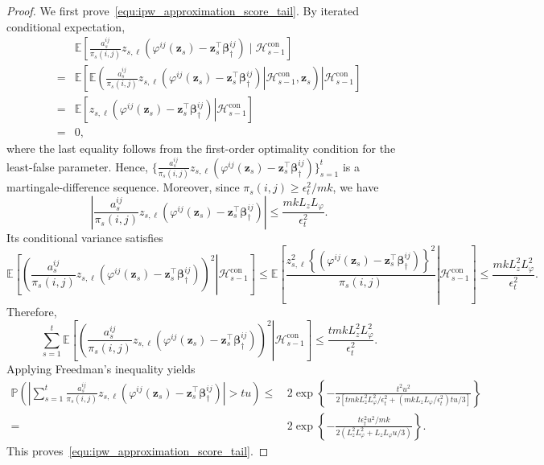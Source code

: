 \documentclass[12pt]{article}
\begin{document}
\begin{proof}
We first prove~\eqref{equ:ipw_approximation_score_tail}. 
By iterated conditional expectation,
\begin{align*}
& \mathbb E
\left[
\frac{ a_s^{ij} }{ \pi_s(i,j) } z_{s,\ell} \left(\varphi^{ij}(\bm z_s) - \bm z_s^\top\bm\beta_\dagger^{ij} \right)
\mid
\mathcal H_{s-1}^{\mathrm{con}}
\right] \\
=&
\mathbb E
\left[\left.
\mathbb E\left(
\left.\frac{a_s^{ij}}{\pi_s(i,j)}z_{s,\ell}
\left(\varphi^{ij}(\bm z_s) - \bm z_s^\top\bm\beta_\dagger^{ij} \right)
\right|
\mathcal H_{s-1}^{\mathrm{con}},\bm z_s
\right)\right|\mathcal H_{s-1}^{\mathrm{con}}\right] \\
=&
\mathbb E
\left[
z_{s,\ell} \left.
\left(\varphi^{ij}(\bm z_s) - \bm z_s^\top\bm\beta_\dagger^{ij} \right) \right|\mathcal H_{s-1}^{\mathrm{con}} 
\right] \\
=& 0,
\end{align*}
where the last equality follows from the first-order optimality condition for the least-false parameter. Hence, $\{\frac{ a_s^{ij} }{ \pi_s(i,j) } z_{s,\ell} \left(\varphi^{ij}(\bm z_s) - \bm z_s^\top\bm\beta_\dagger^{ij} \right)\}_{s=1}^t$ is a martingale-difference sequence.
Moreover, since $\pi_s(i,j) \ge {\epsilon_t^2}/{mk}$, we have
\[
\left|
\frac{ a_s^{ij} }{ \pi_s(i,j) } z_{s,\ell} \left(\varphi^{ij}(\bm z_s) - \bm z_s^\top\bm\beta_\dagger^{ij} \right)
\right|
\le
\frac{mk L_zL_\varphi}{\epsilon_t^2}.
\]
Its conditional variance satisfies
\small{
\begin{equation*}
\mathbb E
\left[
\left.
\left(
\frac{ a_s^{ij} }{ \pi_s(i,j) } z_{s,\ell} \left(\varphi^{ij}(\bm z_s) - \bm z_s^\top\bm\beta_\dagger^{ij} \right)
\right)^2
\right|
\mathcal H_{s-1}^{\mathrm{con}}
\right]
\le
\mathbb E
\left[
\left.
\frac{
z_{s,\ell}^2
\left\{
\left(\varphi^{ij}(\bm z_s) - \bm z_s^\top\bm\beta_\dagger^{ij} \right)
\right\}^2}{\pi_s(i,j)}
\right|
\mathcal H_{s-1}^{\mathrm{con}}
\right]
\le 
\frac{mk L_z^2L_\varphi^2}{\epsilon_t^2}.
\end{equation*}
}
Therefore,
\[
\sum_{s=1}^t
\mathbb E
\left[
\left.
\left(
\frac{ a_s^{ij} }{ \pi_s(i,j) } z_{s,\ell} \left(\varphi^{ij}(\bm z_s) - \bm z_s^\top\bm\beta_\dagger^{ij} \right)
\right)^2
\right|
\mathcal H_{s-1}^{\mathrm{con}}
\right]
\le
\frac{tmkL_z^2L_\varphi^2}{\epsilon_t^2}.
\]
Applying Freedman's inequality yields
\begin{align*}
\mathbb P
\left(
\left|
\sum_{s=1}^t
\frac{ a_s^{ij} }{ \pi_s(i,j) } z_{s,\ell} \left(\varphi^{ij}(\bm z_s) - \bm z_s^\top\bm\beta_\dagger^{ij} \right)
\right|>tu
\right)
\le & \,
2\exp
\left\{
-
\frac{t^2u^2}{2\left[tmkL_z^2L_\varphi^2/\epsilon_t^2
+ (mk L_zL_\varphi/\epsilon_t^2)tu/3
\right]
}
\right\}
\\
= & \,
2\exp\left\{
-\frac{t\epsilon_t^2u^2/mk}{2\left(L_z^2L_\varphi^2+L_zL_\varphi u/3\right)}
\right\}.
\end{align*}
This proves~\eqref{equ:ipw_approximation_score_tail}.


\end{proof}
\end{document}
